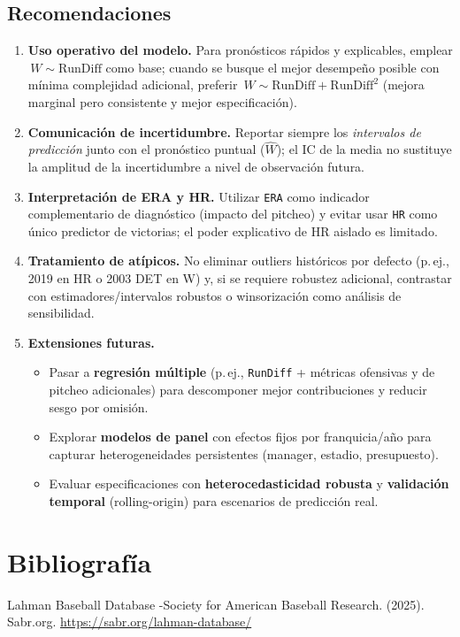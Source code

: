 \documentclass[man,floatsintext]{apa7}
\begin{document}
\subsection{Recomendaciones}
\begin{enumerate}
    \item \textbf{Uso operativo del modelo.} Para pronósticos rápidos y explicables, emplear \(\,W \sim \text{RunDiff}\) como base; cuando se busque el mejor desempeño posible con mínima complejidad adicional, preferir \(\,W \sim \text{RunDiff} + \text{RunDiff}^2\) (mejora marginal pero consistente y mejor especificación).
    \item \textbf{Comunicación de incertidumbre.} Reportar siempre los \textit{intervalos de predicción} junto con el pronóstico puntual (\(\hat{W}\)); el IC de la media no sustituye la amplitud de la incertidumbre a nivel de observación futura.
    \item \textbf{Interpretación de ERA y HR.} Utilizar \texttt{ERA} como indicador complementario de diagnóstico (impacto del pitcheo) y evitar usar \texttt{HR} como único predictor de victorias; el poder explicativo de HR aislado es limitado.
    \item \textbf{Tratamiento de atípicos.} No eliminar outliers históricos por defecto (p.\,ej., 2019 en HR o 2003 DET en W) y, si se requiere robustez adicional, contrastar con estimadores/intervalos robustos o winsorización como análisis de sensibilidad.
    \item \textbf{Extensiones futuras.} 
    \begin{itemize}
        \item Pasar a \textbf{regresión múltiple} (p.\,ej., \texttt{RunDiff} + métricas ofensivas y de pitcheo adicionales) para descomponer mejor contribuciones y reducir sesgo por omisión.
        \item Explorar \textbf{modelos de panel} con efectos fijos por franquicia/año para capturar heterogeneidades persistentes (manager, estadio, presupuesto).
        \item Evaluar especificaciones con \textbf{heterocedasticidad robusta} y \textbf{validación temporal} (rolling-origin) para escenarios de predicción real.
    \end{itemize}
\end{enumerate}
\section{Bibliografía}
Lahman Baseball Database -Society for American Baseball Research. (2025). Sabr.org. \url{https://sabr.org/lahman-database/}
\end{document}
